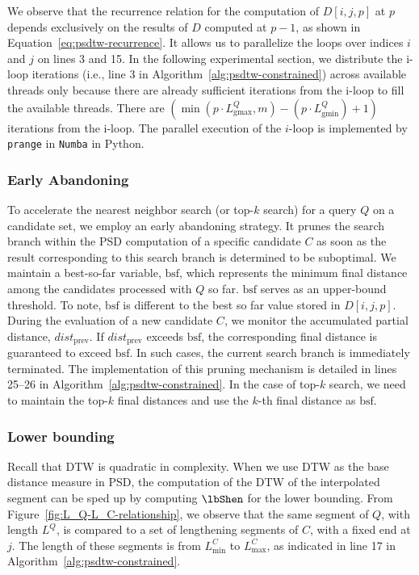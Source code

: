 We observe that the recurrence relation for the computation of $D[i, j, p]$ at $p$ depends exclusively on the results of $D$ computed at $p-1$, as shown in Equation~\ref{eq:psdtw-recurrence}.
It allows us to parallelize the loops over indices $i$ and $j$ on lines 3 and 15.
In the following experimental section, we distribute the i-loop iterations (i.e., line 3 in Algorithm~\ref{alg:psdtw-constrained}) across available threads only because there are already sufficient iterations from the i-loop to fill the available threads.
There are $\left(\min(p \cdot L_{\mathrm{gmax}}^Q, m) - (p \cdot L_{\mathrm{gmin}}^Q) + 1\right)$ iterations from the i-loop.
The parallel execution of the $i$-loop is implemented by \texttt{prange} in \texttt{Numba} in Python.
  
\subsubsection{Early Abandoning} %

To accelerate the nearest neighbor search (or top-$k$ search) for a query $Q$ on a candidate set, we employ an early abandoning strategy. 
It prunes the search branch within the PSD computation of a specific candidate $C$ as soon as the result corresponding to this search branch is determined to be suboptimal. 
We maintain a best-so-far variable, $\mathrm{bsf}$, which represents the minimum final distance among the candidates processed with $Q$ so far. 
$\mathrm{bsf}$ serves as an upper-bound threshold.
To note, $\mathrm{bsf}$ is different to the best so far value stored in $D[i,j,p]$. 
During the evaluation of a new candidate $C$, we monitor the accumulated partial distance, $\mathit{dist}_{\mathrm{prev}}$. 
If $\mathit{dist}_{\mathrm{prev}}$ exceeds $\mathrm{bsf}$, the corresponding final distance is guaranteed to exceed $\mathrm{bsf}$.
In such cases, the current search branch is immediately terminated. 
The implementation of this pruning mechanism is detailed in lines 25--26 in Algorithm~\ref{alg:psdtw-constrained}.
In the case of top-$k$ search, we need to maintain the top-$k$ final distances and use the $k$-th final distance as $\mathrm{bsf}$.

\subsubsection{Lower bounding}


Recall that DTW is quadratic in complexity.
When we use DTW as the base distance measure in PSD, the computation of the DTW of the interpolated segment can be sped up by computing $\lbShen$ for the lower bounding.
From Figure~\ref{fig:L_Q-L_C-relationship}, we observe that the same segment of $Q$, with length $L^Q$, is compared to a set of lengthening segments of $C$, with a fixed end at $j$.
The length of these segments is from $L_{\min}^C$ to $L_{\max}^C$, as indicated in line 17 in Algorithm~\ref{alg:psdtw-constrained}.

